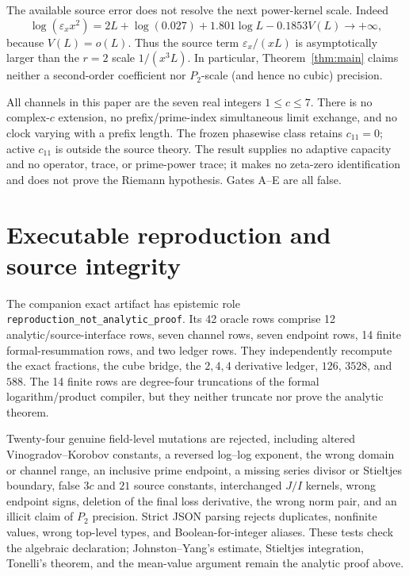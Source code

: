 \documentclass[11pt]{article}
\theoremstyle{definition}
\theoremstyle{remark}
\newcommand{\eps}{\varepsilon}
\begin{document}
The available source error does not resolve the next power-kernel scale.
Indeed
\begin{equation}
 \log(\eps_x x^2)
 =2L+\log(0.027)+1.801\log L-0.1853V(L)\longrightarrow+\infty,
 \label{eq:no-P2}
\end{equation}
because $V(L)=o(L)$.  Thus the source term $\eps_x/(xL)$ is asymptotically
larger than the $r=2$ scale $1/(x^3L)$.  In particular,
Theorem~\ref{thm:main} claims neither a second-order coefficient nor
$P_2$-scale (and hence no cubic) precision.

All channels in this paper are the seven real integers $1\le c\le7$.
There is no complex-$c$ extension, no prefix/prime-index simultaneous
limit exchange, and no clock varying with a prefix length.  The frozen
phasewise class retains $c_{11}=0$; active $c_{11}$ is outside the source
theory.  The result supplies no adaptive capacity and no operator, trace,
or prime-power trace; it makes no zeta-zero identification and does not
prove the Riemann hypothesis.  Gates A--E are all false.

\section{Executable reproduction and source integrity}
\label{sec:artifact}

The companion exact artifact has epistemic role
\texttt{reproduction\_not\_analytic\_proof}.  Its 42 oracle rows comprise
12 analytic/source-interface rows, seven channel rows, seven endpoint
rows, 14 finite formal-resummation rows, and two ledger rows.  They
independently recompute the exact fractions, the cube bridge, the
$2,4,4$ derivative ledger, $126$, $3528$, and $588$.  The 14 finite rows
are degree-four truncations of the formal logarithm/product compiler, but
they neither truncate nor prove the analytic theorem.

Twenty-four genuine field-level mutations are rejected, including altered
Vinogradov--Korobov constants, a reversed log--log exponent, the wrong
domain or channel range, an inclusive prime endpoint, a missing series
divisor or Stieltjes boundary, false $3c$ and $21$ source constants,
interchanged $J/I$ kernels, wrong endpoint signs, deletion of the final
loss derivative, the wrong norm pair, and an illicit claim of $P_2$
precision.  Strict JSON parsing rejects duplicates, nonfinite values,
wrong top-level types, and Boolean-for-integer aliases.  These tests check
the algebraic declaration; Johnston--Yang's estimate, Stieltjes
integration, Tonelli's theorem, and the mean-value argument remain the
analytic proof above.
\end{document}
